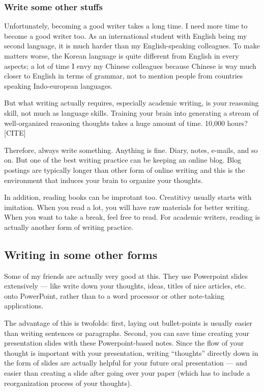 \documentclass[11pt]{article}
\begin{document}

\subsubsection{Write some other stuffs}
Unfortunately, becoming a good writer takes a long time. I need
more time to become a good writer too. As an international student
with English being my second language, it is much harder than my
English-speaking colleagues. To make matters worse, the Korean
language is quite different from English in every aspects; a lot
of time I envy my Chinese colleagues because Chinese is way much
closer to English in terms of grammar, not to mention people from
countries speaking Indo-european languages.

But what writing actually requires, especially academic writing,
is your reasoning skill, not much as language skills. Training
your brain into generating a stream of well-organized reasoning
thoughts takes a huge amount of time. 10,000 hours? [CITE]

Therefore, always write something. Anything is fine. Diary, notes,
e-mails, and so on. But one of the best writing practice can be
keeping an online blog.  Blog postings are typically longer than
other form of online writing and this is the environment that
induces your brain to organize your thoughts. 

In addition, reading books can be improtant too. Creatitivy
usually starts with imitation. When you read a lot, you will have
raw materials for better writing.  When you want to take a break,
feel free to read. For academic writers, reading is actually
another form of writing practice.

\subsection{Writing in some other forms}
Some of my friends are actually very good at this. They use Powerpoint slides
extensively --- like write down your thoughts, ideas, titles of nice articles,
etc. onto PowerPoint, rather than to a word processor or other note-taking
applications.

The advantage of this is twofolds: first, laying out bullet-points is usually
easier than writing sentences or paragraphs. Second, you can save time
creating your presentation slides with these Powerpoint-based notes. Since
the flow of your thought is important with your presentation, writing
``thoughts'' directly down in the form of slides are actually helpful for your
future oral presentation --- and easier than creating a slide after going
over your paper (which has to include a reorganization process of your
thoughts).
\end{document}

